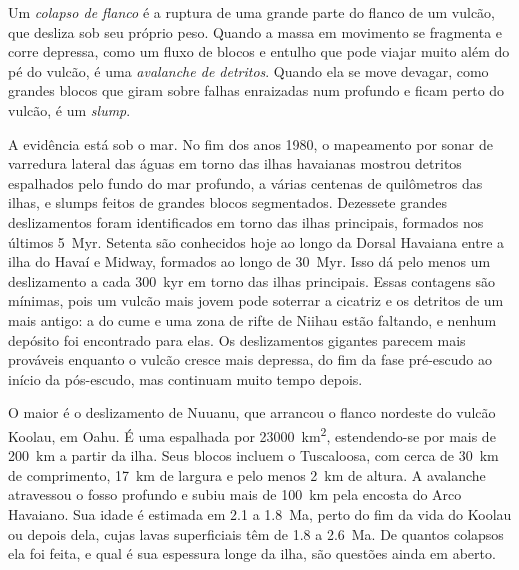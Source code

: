 \begin{definition}\label{def:b2:oceanic-islands:collapse}
Um \emph{colapso de flanco} é a ruptura de uma grande parte do flanco de um
vulcão, que desliza sob seu próprio peso. Quando a massa em movimento se fragmenta e corre
depressa, como um fluxo de blocos e entulho que pode viajar muito além do pé do vulcão, é uma
\emph{avalanche de detritos}. Quando ela se move devagar, como grandes blocos que giram
sobre falhas enraizadas num  profundo e ficam perto do vulcão, é um \emph{slump}.
\end{definition}

A evidência está sob o mar. No fim dos anos 1980, o mapeamento por sonar de varredura lateral das águas em torno
das ilhas havaianas mostrou detritos espalhados pelo fundo do mar profundo, a várias centenas de quilômetros
das ilhas, e slumps feitos de grandes blocos segmentados. Dezessete grandes deslizamentos foram identificados
em torno das ilhas principais, formados nos últimos \qty{5}{Myr}. Setenta são conhecidos hoje ao longo da
Dorsal Havaiana entre a ilha do Havaí e Midway, formados ao longo de \qty{30}{Myr}. Isso dá pelo
menos um deslizamento a cada \qty{300}{kyr} em torno das ilhas principais. Essas contagens são mínimas, pois um
vulcão mais jovem pode soterrar a cicatriz e os detritos de um mais antigo: a  do cume e uma zona de rifte
de Niihau estão faltando, e nenhum depósito foi encontrado para elas. Os deslizamentos gigantes parecem mais prováveis enquanto o
vulcão cresce mais depressa, do fim da fase pré-escudo ao início da pós-escudo, mas continuam
muito tempo depois.

O maior é o deslizamento de Nuuanu, que arrancou o flanco nordeste do vulcão
Koolau, em Oahu. É uma  espalhada por \qty{23000}{km^2}, estendendo-se por mais de
\qty{200}{km} a partir da ilha. Seus blocos incluem o  Tuscaloosa, com cerca de \qty{30}{km} de comprimento,
\qty{17}{km} de largura e pelo menos \qty{2}{km} de altura. A avalanche atravessou o fosso profundo e subiu
mais de \qty{100}{km} pela encosta do Arco Havaiano. Sua idade é estimada em 2.1 a
\qty{1.8}{Ma}, perto do fim da vida do Koolau ou depois dela, cujas lavas superficiais têm de 1.8 a
\qty{2.6}{Ma}. De quantos colapsos ela foi feita, e qual é sua espessura longe da ilha,
são questões ainda em aberto.

